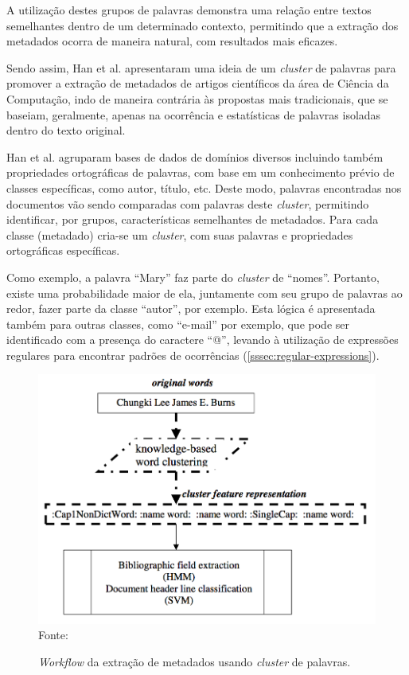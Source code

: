 A utilização destes grupos de palavras demonstra uma relação entre textos semelhantes dentro de um determinado contexto, permitindo que a extração dos metadados ocorra de maneira natural, com resultados mais eficazes.

Sendo assim, Han et al. apresentaram uma ideia de um \textit{cluster} de palavras para promover a extração de metadados de artigos científicos da área de Ciência da Computação, indo de maneira contrária às propostas mais tradicionais, que se baseiam, geralmente, apenas na ocorrência e estatísticas de palavras isoladas dentro do texto original.

Han et al. agruparam bases de dados de domínios diversos incluindo também propriedades ortográficas de palavras, com base em um conhecimento prévio de classes específicas, como autor, título, etc. Deste modo, palavras encontradas nos documentos vão sendo comparadas com palavras deste \textit{cluster}, permitindo identificar, por grupos, características semelhantes de metadados. Para cada classe (metadado) cria-se um \textit{cluster}, com suas palavras e propriedades ortográficas específicas.

Como exemplo, a palavra ``Mary'' faz parte do \textit{cluster} de ``nomes''. Portanto, existe uma probabilidade maior de ela, juntamente com seu grupo de palavras ao redor, fazer parte da classe ``autor'', por exemplo. Esta lógica é apresentada também para outras classes, como ``e-mail'' por exemplo, que pode ser identificado com a presença do caractere ``@'', levando à utilização de expressões regulares para encontrar padrões de ocorrências (\autoref{sssec:regular-expressions}).

\begin{figure}[h!]
    \centering
    \caption{\emph{Workflow} da extração de metadados usando \textit{cluster} de palavras.}
    \label{fig:workflow-rule-based}
    \includegraphics[width=0.7\linewidth]{./assets/images/workflow-rule-based}
    \center\footnotesize{Fonte: \cite{Han-Giles-WC}}
\end{figure}

